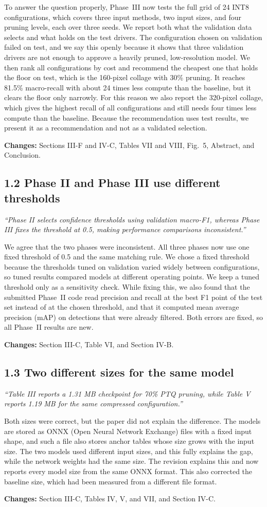 \documentclass[10pt]{article}
\newcommand{\comment}[2]{\subsection*{#1}\textit{#2}\par}
\newcommand{\changes}[1]{\par\textbf{Changes:} #1}
\begin{document}
To answer the question properly, Phase~III now tests the full grid of 24 INT8 configurations, which covers three input methods, two input sizes, and four pruning levels, each over three seeds. We report both what the validation data selects and what holds on the test drivers. The configuration chosen on validation failed on test, and we say this openly because it shows that three validation drivers are not enough to approve a heavily pruned, low-resolution model. We then rank all configurations by cost and recommend the cheapest one that holds the floor on test, which is the 160-pixel collage with 30\% pruning. It reaches 81.5\% macro-recall with about 24 times less compute than the baseline, but it clears the floor only narrowly. For this reason we also report the 320-pixel collage, which gives the highest recall of all configurations and still needs four times less compute than the baseline. Because the recommendation uses test results, we present it as a recommendation and not as a validated selection.
\changes{Sections III-F and IV-C, Tables VII and VIII, Fig.~5, Abstract, and Conclusion.}

\comment{1.2 Phase II and Phase III use different thresholds}{``Phase II selects confidence thresholds using validation macro-F1, whereas Phase III fixes the threshold at 0.5, making performance comparisons inconsistent.''}
We agree that the two phases were inconsistent. All three phases now use one fixed threshold of 0.5 and the same matching rule. We chose a fixed threshold because the thresholds tuned on validation varied widely between configurations, so tuned results compared models at different operating points. We keep a tuned threshold only as a sensitivity check. While fixing this, we also found that the submitted Phase~II code read precision and recall at the best F1 point of the test set instead of at the chosen threshold, and that it computed mean average precision (mAP) on detections that were already filtered. Both errors are fixed, so all Phase~II results are new.
\changes{Section III-C, Table VI, and Section IV-B.}

\comment{1.3 Two different sizes for the same model}{``Table III reports a 1.31 MB checkpoint for 70\% PTQ pruning, while Table V reports 1.19 MB for the same compressed configuration.''}
Both sizes were correct, but the paper did not explain the difference. The models are stored as ONNX (Open Neural Network Exchange) files with a fixed input shape, and such a file also stores anchor tables whose size grows with the input size. The two models used different input sizes, and this fully explains the gap, while the network weights had the same size. The revision explains this and now reports every model size from the same ONNX format. This also corrected the baseline size, which had been measured from a different file format.
\changes{Section III-C, Tables IV, V, and VII, and Section IV-C.}
\end{document}
